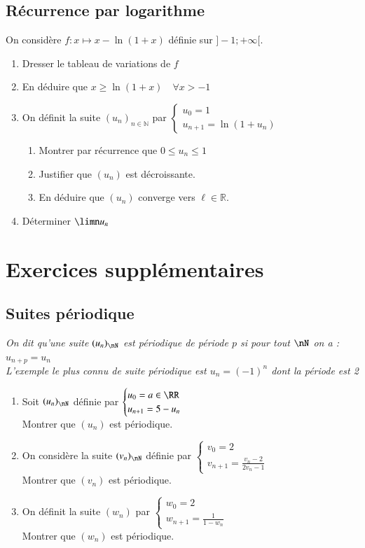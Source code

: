 \documentclass[oneside,12pt]{article}          %
\begin{document}
\subsection{Récurrence par logarithme}
On considère $f : x \mapsto x - \ln(1 + x)$ définie sur $]-1; +\infty[$.
\begin{enumerate}
    \item Dresser le tableau de variations de $f$
    \item En déduire que $x \geq \ln(1 + x) \quad \forall x > -1$
    \item On définit la suite $(u_n)_{n \in \mathbb{N}}$ par $\begin{cases}u_0=1\\u_{n+1}=\ln(1+u_n)\end{cases}$
    \begin{enumerate}
        \item Montrer par récurrence que $0 \leq u_n \leq 1$
        \item Justifier que $(u_n)$ est décroissante.
        \item En déduire que $(u_n)$ converge vers $\ell \in \mathbb{R}$.
    \end{enumerate}
    \item Déterminer $\limn u_n$
\end{enumerate}



\section{Exercices supplémentaires}

\subsection{Suites périodique}
\textit{On dit qu'une suite $(u_n)_{\nN}$ est périodique de période $p$ si pour tout $\nN$ on a : $u_{n+p}=u_n$ \\
L'exemple le plus connu de suite périodique est $u_n=(-1)^n$ dont la période est 2}
\begin{enumerate}
    \item Soit $(u_n)_{\nN}$ définie par $\begin{cases}u_0=a\in\RR\\u_{n+1}=5-u_n\end{cases}$\\
    Montrer que $(u_n)$ est périodique.
    \item On considère la suite $(v_n)_{\nN}$ définie par $\begin{cases}v_0=2\\v_{n+1}=\frac{v_n-2}{2v_n-1}\end{cases}$\\
    Montrer que $(v_n)$ est périodique.
    \item On définit la suite $(w_n)$ par $\begin{cases}w_0=2\\w_{n+1}=\frac{1}{1-w_n}\end{cases}$\\
    Montrer que $(w_n)$ est périodique.
\end{enumerate}
\end{document}
